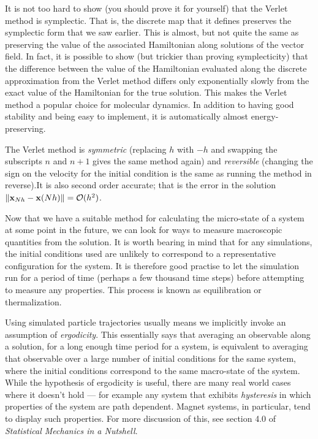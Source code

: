It is not too hard to show (you should prove it for yourself) that the Verlet method is symplectic. That is, the discrete map that it defines preserves the symplectic form that we saw earlier. This is almost, but not quite the same as preserving the value of the associated Hamiltonian along solutions of the vector field. In fact, it is possible to show (but trickier than proving symplecticity) that the difference between the value of the Hamiltonian evaluated along the discrete approximation from the Verlet method differs only exponentially slowly from the exact value of the Hamiltonian for the true solution. This makes the Verlet method a popular choice for molecular dynamics. In addition to having good stability and being easy to implement, it is automatically almost energy-preserving.

The Verlet method is \emph{symmetric} (replacing $h$ with $-h$ and swapping the subscripts $n$ and $n+1$ gives the same method again) and \emph{reversible} (changing the sign on the velocity for the initial condition is the same as running the method in reverse).It is also second order accurate; that is the error in the solution $\|{\bf x}_{Nh}-{\bf x}(Nh)\|=\mathcal{O}(h^2)$.

Now that we have a suitable method for calculating the micro-state of a system at some point in the future, we can look for ways to measure macroscopic quantities from the solution. It is worth bearing in mind that for any simulations, the initial conditions used are unlikely to correspond to a representative configuration for the system. It is therefore good practise to let the simulation run for a period of time (perhaps a few thousand time steps) before attempting to measure any properties. This process is known as equilibration or thermalization.

Using simulated particle trajectories usually means we implicitly invoke an assumption of \emph{ergodicity}. This essentially says that averaging an observable along a solution, for a long enough time period for a system, is equivalent to averaging that observable over a large number of initial conditions for the same system, where the initial conditions correspond to the same macro-state of the system. While the hypothesis of ergodicity is useful, there are many real world cases where it doesn't hold --- for example any system that exhibits \emph{hysteresis} in which properties of the system are path dependent. Magnet systems, in particular, tend to display such properties. For more discussion of this, see section 4.0 of \emph{Statistical Mechanics in a Nutshell}.


